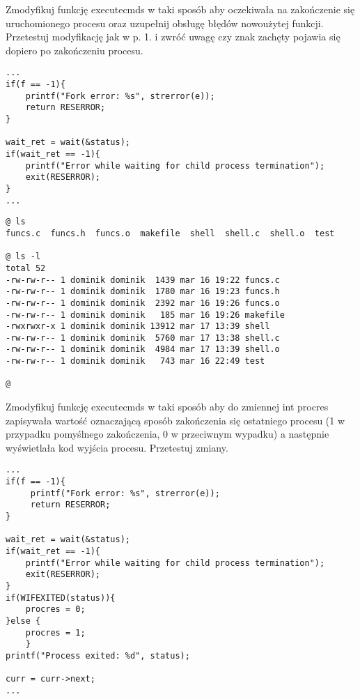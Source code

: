 \documentclass[a4paper,15pt]{article}
\newcommand{\assignment}[2]{
    \begin{tcolorbox}[colback=black!5!white,colframe=black,title={Zadanie #1}]
        #2
    \end{tcolorbox}
}
\begin{document}
\assignment{}{Zmodyfikuj funkcję executecmds w taki sposób aby oczekiwała na zakończenie się uruchomionego procesu oraz uzupełnij obsługę błędów nowoużytej funkcji.
Przetestuj modyfikację jak w p. 1. i zwróć uwagę czy znak zachęty pojawia się dopiero po zakończeniu procesu.}

\begin{lstlisting}[style=CStyle, label=some-code, caption=dodanie obsługi czekania na proces dziecko]
...
if(f == -1){
   	printf("Fork error: %s", strerror(e));
    return RESERROR;
}
        
wait_ret = wait(&status);
if(wait_ret == -1){
	printf("Error while waiting for child process termination");
	exit(RESERROR);
}
...
\end{lstlisting}



\begin{lstlisting}[style=CStyle, label=some-code, caption=testowanie wait]
@ ls
funcs.c  funcs.h  funcs.o  makefile  shell  shell.c  shell.o  test

@ ls -l
total 52
-rw-rw-r-- 1 dominik dominik  1439 mar 16 19:22 funcs.c
-rw-rw-r-- 1 dominik dominik  1780 mar 16 19:23 funcs.h
-rw-rw-r-- 1 dominik dominik  2392 mar 16 19:26 funcs.o
-rw-rw-r-- 1 dominik dominik   185 mar 16 19:26 makefile
-rwxrwxr-x 1 dominik dominik 13912 mar 17 13:39 shell
-rw-rw-r-- 1 dominik dominik  5760 mar 17 13:38 shell.c
-rw-rw-r-- 1 dominik dominik  4984 mar 17 13:39 shell.o
-rw-rw-r-- 1 dominik dominik   743 mar 16 22:49 test

@ 
\end{lstlisting}

\assignment{}{Zmodyfikuj funkcję executecmds w taki sposób aby do zmiennej int procres zapisywała wartość oznaczającą sposób zakończenia się ostatniego procesu (1 w przypadku pomyślnego zakończenia, 0 w przeciwnym wypadku) a następnie wyświetlała kod wyjścia procesu. Przetestuj zmiany.}

\begin{lstlisting}[style=CStyle, label=some-code, caption=dodanie zmiennej procres - wypisanie sposobu zakończenia procesu dziecka]
...
if(f == -1){
     printf("Fork error: %s", strerror(e));
     return RESERROR;
}
        
wait_ret = wait(&status);
if(wait_ret == -1){
	printf("Error while waiting for child process termination");
	exit(RESERROR);
}
if(WIFEXITED(status)){
	procres = 0;
}else {
	procres = 1;
	}
printf("Process exited: %d", status);
		  
curr = curr->next;
...
\end{lstlisting}
\end{document}
